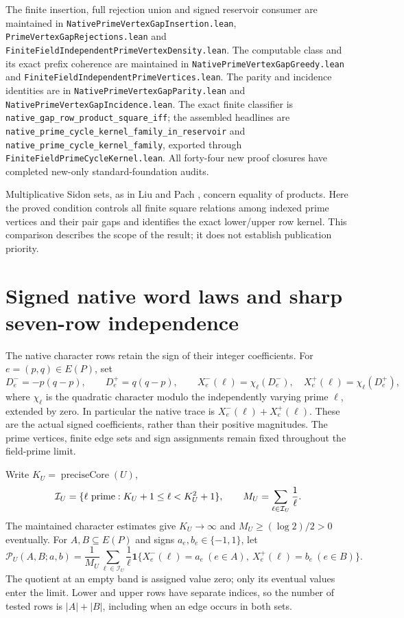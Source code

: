 \documentclass[11pt]{article}
\begin{document}
The finite insertion, full rejection union and signed reservoir consumer
are maintained in \texttt{NativePrimeVertexGapInsertion.lean},
\texttt{PrimeVertexGapRejections.lean} and
\texttt{FiniteFieldIndependentPrimeVertexDensity.lean}.
The computable class and its exact prefix coherence are maintained in
\texttt{NativePrimeVertexGapGreedy.lean} and
\texttt{FiniteFieldIndependentPrimeVertices.lean}.
The parity and incidence identities are in
\texttt{NativePrimeVertexGapParity.lean} and
\texttt{NativePrimeVertexGapIncidence.lean}.
The exact finite classifier is
\texttt{native\_gap\_row\_product\_square\_iff};
the assembled headlines are
\texttt{native\_prime\_cycle\_kernel\_family\_in\_reservoir}
and \texttt{native\_prime\_cycle\_kernel\_family},
exported through \texttt{FiniteFieldPrimeCycleKernel.lean}.
All forty-four new proof closures have completed new-only standard-foundation
audits.

Multiplicative Sidon sets, as in Liu and Pach
\cite{LiuPachMultiplicativeSidon}, concern equality of products.
Here the proved condition controls all finite square relations among
indexed prime vertices and their pair gaps and identifies the exact
lower/upper row kernel. This comparison describes the scope of the result;
it does not establish publication priority.

\section{Signed native word laws and sharp seven-row independence}
\label{sec:native-signed-word-law}

The native character rows retain the sign of their integer coefficients.
For \(e=(p,q)\in E(P)\), set
\[
 D^-_e=-p(q-p),\qquad D^+_e=q(q-p),\qquad
 X^-_e(\ell)=\chi_\ell(D^-_e),\quad X^+_e(\ell)=\chi_\ell(D^+_e),
\]
where \(\chi_\ell\) is the quadratic character modulo the independently
varying prime \(\ell\), extended by zero.
In particular the native trace is \(X^-_e(\ell)+X^+_e(\ell)\).
These are the actual signed coefficients, rather than their positive
magnitudes. The prime vertices, finite edge sets and sign assignments
remain fixed throughout the field-prime limit.

Write \(K_U=\operatorname{preciseCore}(U)\),
\[
 \mathcal I_U=\{\ell\ {\rm prime}:K_U+1\leq\ell<K_U^2+1\},
 \qquad M_U=\sum_{\ell\in\mathcal I_U}\frac1\ell.
\]
The maintained character estimates give \(K_U\to\infty\) and
\(M_U\geq(\log2)/2>0\) eventually.
For \(A,B\subseteq E(P)\) and signs \(a_e,b_e\in\{-1,1\}\), let
\[
 \mathcal P_U(A,B;a,b)=\frac1{M_U}
 \sum_{\ell\in\mathcal I_U}\frac1\ell
 \mathbf1\{X^-_e(\ell)=a_e\ (e\in A),\
             X^+_e(\ell)=b_e\ (e\in B)\}.
\]
The quotient at an empty band is assigned value zero; only its eventual
values enter the limit. Lower and upper rows have separate indices, so
the number of tested rows is \(|A|+|B|\), including when an edge occurs
in both sets.
\end{document}
